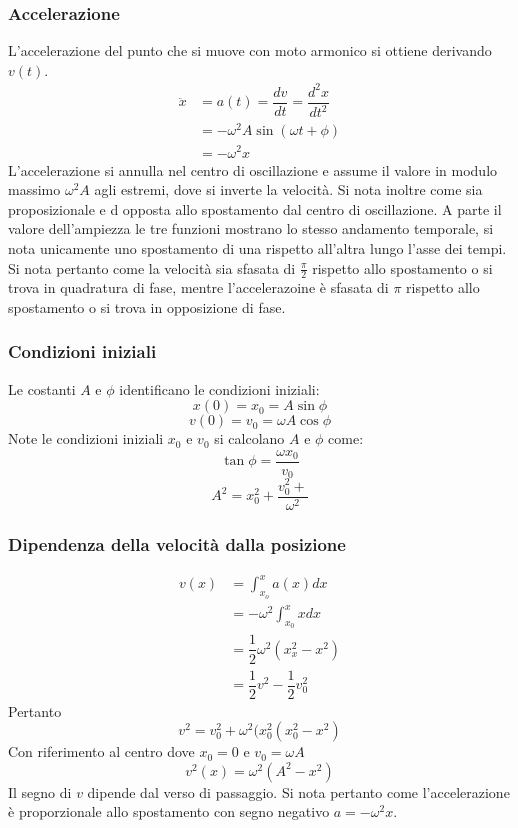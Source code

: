 		\subsubsection{Accelerazione}
		L'accelerazione del punto che si muove con moto armonico si ottiene derivando $v(t)$.
		\begin{align*}
			\ddot{x} &= a(t) = \dfrac{dv}{dt} = \dfrac{d^2x}{dt^2}\\
			       &= -\omega^2 A \sin(\omega t + \phi)\\
			       &= -\omega^2 x
		\end{align*}
		L'accelerazione si annulla nel centro di oscillazione e assume il valore in modulo massimo $\omega^2 A$ agli estremi, dove si inverte la velocit\`a.
		Si nota inoltre come sia proposizionale e d opposta allo spostamento dal centro di oscillazione.
		A parte il valore dell'ampiezza le tre funzioni mostrano lo stesso andamento temporale, si nota unicamente uno spostamento di una rispetto all'altra lungo l'asse dei tempi.
		Si nota pertanto come la velocit\`a sia sfasata di $\frac{\pi}{2}$  rispetto allo spostamento o si trova in quadratura di fase, mentre l'accelerazoine \`e sfasata di $\pi$ rispetto allo spostamento o si trova in opposizione di fase.

		\subsubsection{Condizioni iniziali}
		Le costanti $A$ e $\phi$ identificano le condizioni iniziali:
		$$ x(0) = x_0 = A \sin\phi$$
		$$v(0) = v_0 = \omega A \cos\phi$$
		Note le condizioni iniziali $x_0$ e $v_0$ si calcolano $A$ e $\phi$ come:
		$$\tan \phi = \dfrac{\omega x_0}{v_0}$$
		$$A^2 = x_0^2 + \dfrac{v_0^2+}{\omega^2}$$

		\subsubsection{Dipendenza della velocit\`a dalla posizione}
		\begin{align*}
			v(x) &= \int_{x_o}^x a(x)dx\\
			     &=-\omega^2\int_{x_0}^x xdx\\
			     &=\dfrac{1}{2}\omega^2(x_x^2-x^2)\\
			     &=\dfrac{1}{2}v^2 - \dfrac{1}{2}v_0^2
		\end{align*}
		Pertanto
		$$v^2 = v_0^2 + \omega^2(x_0^2(x_0^2-x^2)$$
		Con riferimento al centro dove $x_0 = 0$ e $v_0 = \omega A$
		$$v^2(x)=\omega^2(A^2 - x^2)$$
		Il segno di $v$ dipende dal verso di passaggio.
		Si nota pertanto come l'accelerazione \`e proporzionale allo spostamento con segno negativo $a =-\omega^2 x$.

